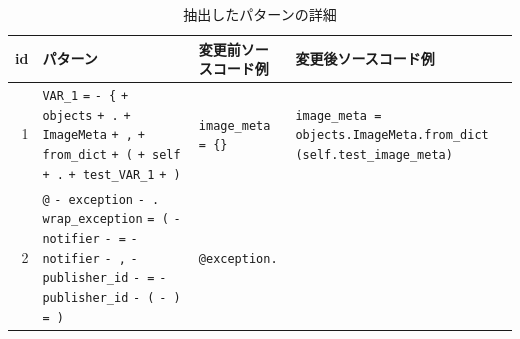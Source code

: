 \documentclass[11pt]{jreport}
\begin{document}
\begin{table}[t]
    \centering
    \caption{抽出したパターンの詳細}
    \label{table:description}
    \begin{tabular}{r|p{5cm}|p{4.5cm}|p{4.5cm}}
        \hline \hline
        id & パターン & 変更前ソースコード例 & 変更後ソースコード例 \\ \hline
        1 & 
        \colorbox{lightgray!50}{\texttt{VAR\_1}} \colorbox{lightgray!50}{\texttt{=}} \colorbox{lightgray!50}{\texttt{- \{}} \colorbox{lightgray!50}{\texttt{+ objects}} 
        \newline
        \colorbox{lightgray!50}{\texttt{+ .}} \colorbox{lightgray!50}{\texttt{+ ImageMeta}} \colorbox{lightgray!50}{\texttt{+ ,}} 
        \newline
        \colorbox{lightgray!50}{\texttt{+ from\_dict}} \colorbox{lightgray!50}{\texttt{+ (}} \colorbox{lightgray!50}{\texttt{+ self}} 
        \newline
        \colorbox{lightgray!50}{\texttt{+ .}} \colorbox{lightgray!50}{\texttt{+ test\_VAR\_1}} \colorbox{lightgray!50}{\texttt{+ )}}
        & 
        \texttt{image\_meta = \{\}} 
        & 
        \texttt{image\_meta = \newline
        objects.ImageMeta.from\_dict \newline
        (self.test\_image\_meta)} \\
        \hline
        2 &
        \colorbox{lightgray!50}{\texttt{@}} \colorbox{lightgray!50}{\texttt{- exception}} \colorbox{lightgray!50}{\texttt{- .}} 
        \newline
        \colorbox{lightgray!50}{\texttt{wrap\_exception}}
        \colorbox{lightgray!50}{\texttt{= (}} 
        \newline
        \colorbox{lightgray!50}{\texttt{- notifier}} 
        \colorbox{lightgray!50}{\texttt{- =}} 
        \newline
        \colorbox{lightgray!50}{\texttt{- notifier}} \colorbox{lightgray!50}{\texttt{- ,}}
        \newline
        \colorbox{lightgray!50}{\texttt{- publisher\_id}} \colorbox{lightgray!50}{\texttt{- =}} 
        \newline
        \colorbox{lightgray!50}{\texttt{- publisher\_id}} \colorbox{lightgray!50}{\texttt{- (}} \colorbox{lightgray!50}{\texttt{- )}} \colorbox{lightgray!50}{\texttt{= )}}
        &
        \texttt{@exception.
        \newline
}
\end{tabular}
\end{table}
\end{document}
